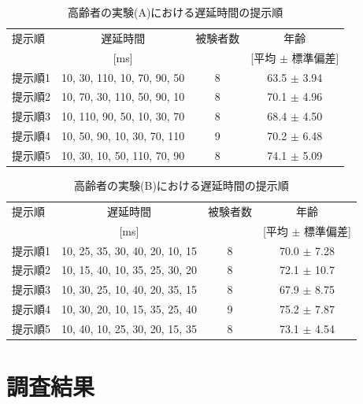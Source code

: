 \begin{table}[btp]
  \caption{高齢者の実験(A)における遅延時間の提示順}
  \label{table:old_a}
  \centering
  \begin{tabular}{lccc}
    \hline
    提示順 & 遅延時間 & 被験者数 & 年齢\\
    　& [ms] & & [平均 $\pm$ 標準偏差]\\
    \hline \hline
    提示順1  & 10, 30, 110, 10, 70, 90, 50  & 8 & 63.5 $\pm$ 3.94\\
    提示順2  & 10, 70, 30, 110, 50, 90, 10  & 8 & 70.1 $\pm$ 4.96\\
    提示順3  & 10, 110, 90, 50, 10, 30, 70  & 8 & 68.4 $\pm$ 4.50\\
    提示順4  & 10, 50, 90, 10, 30, 70, 110  & 9 & 70.2 $\pm$ 6.48\\
    提示順5  & 10, 30, 10, 50, 110, 70, 90  & 8 & 74.1 $\pm$ 5.09
\\
    \hline
  \end{tabular}
\end{table}
\begin{table}[btp]
  \caption{高齢者の実験(B)における遅延時間の提示順}
  \label{table:old_b}
  \centering
  \begin{tabular}{lccc}
    \hline
    提示順 & 遅延時間 & 被験者数 & 年齢\\
    　& [ms] & & [平均 $\pm$ 標準偏差]\\
    \hline \hline
    提示順1  & 10, 25, 35, 30, 40, 20, 10, 15  & 8 & 70.0 $\pm$ 7.28\\
    提示順2  & 10, 15, 40, 10, 35, 25, 30, 20  & 8 & 72.1 $\pm$ 10.7\\
    提示順3  & 10, 30, 25, 10, 40, 20, 35, 15  & 8 & 67.9 $\pm$ 8.75\\
    提示順4  & 10, 30, 20, 10, 15, 35, 25, 40  & 9 & 75.2 $\pm$ 7.87\\
    提示順5  & 10, 40, 10, 25, 30, 20, 15, 35  & 8 & 73.1 $\pm$ 4.54
\\
    \hline
  \end{tabular}
\end{table}
\newpage
\section{調査結果}
